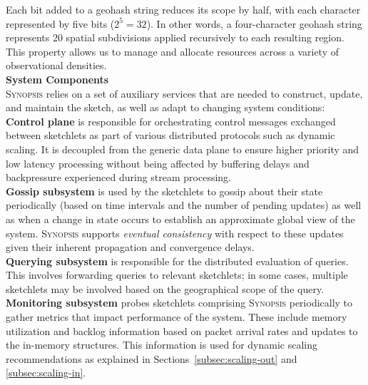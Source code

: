 Each bit added to a geohash string reduces its scope by half, with each character represented by five bits ($2^5 = 32$). In other words, a four-character geohash string represents 20 spatial subdivisions applied recursively to each resulting region. This property allows us to manage and allocate resources across a variety of observational densities.
\vspace{1em} \\
\textbf{System Components}\\
\textsc{Synopsis} relies on a set of auxiliary services that are needed to construct, update, and maintain the sketch, as well as adapt to changing system conditions:
\vspace{0.4em} \\
	\textbf{Control plane} is responsible for orchestrating control messages exchanged between sketchlets as part of various distributed protocols such as dynamic scaling.
    It is decoupled from the generic data plane to ensure higher priority and low latency processing without being affected by buffering delays and backpressure experienced during stream processing.
\vspace{0.4em} \\
	\textbf{Gossip subsystem} is used by the sketchlets to gossip about their state periodically (based on time intervals and the number of pending updates) as well as when a change in state occurs to establish an approximate global view of the system.
    \textsc{Synopsis} supports \emph{eventual consistency} with respect to these updates given their inherent propagation and convergence delays.
\vspace{0.4em} \\
	\textbf{Querying subsystem} is responsible for the distributed evaluation of queries.
    This involves forwarding queries to relevant sketchlets; in some cases, multiple sketchlets may be involved based on the geographical scope of the query.
\vspace{0.4em} \\
    \textbf{Monitoring subsystem} probes sketchlets comprising \textsc{Synopsis} periodically to gather metrics that impact performance of the system.
    These include memory utilization and backlog information based on packet arrival rates and updates to the in-memory structures.
    This information is used for dynamic scaling recommendations as explained in Sections~\ref{subsec:scaling-out} and \ref{subsec:scaling-in}.

